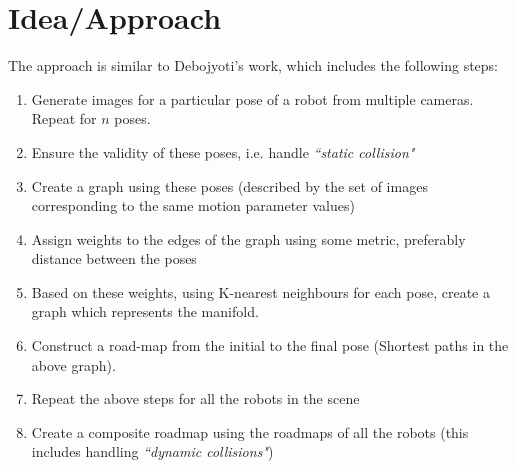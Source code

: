 \documentclass[12pt, two column]{article}
\begin{document}
\section{Idea/Approach}
  The approach is similar to Debojyoti's work, which includes the following steps:
  \begin{enumerate}
    \item Generate images for a particular pose of a robot from multiple cameras. Repeat for $n$ poses.
    \item Ensure the validity of these poses, i.e. handle \textit{``static collision"}
    \item Create a graph using these poses (described by the set of images corresponding to the same motion parameter values)
    \item Assign weights to the edges of the graph using some metric, preferably distance between the poses
    \item Based on these weights, using K-nearest neighbours for each pose, create a graph which represents the manifold.
    \item Construct a road-map from the initial to the final pose (Shortest paths in the above graph).
    \item Repeat the above steps for all the robots in the scene
    \item Create a composite roadmap using the roadmaps of all the robots (this includes handling \textit{``dynamic collisions"})
  \end{enumerate}
\end{document}
